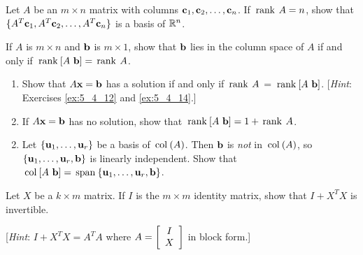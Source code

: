 {{\begin{multicols}{2}
\begin{ex}
Let $A$ be an $m \times n$ matrix with columns $\textbf{c}_{1}, \textbf{c}_{2}, \dots, \textbf{c}_{n}$. If $\thinspace\operatorname{rank\medspace} A = n$, show that $\{A^{T}\textbf{c}_{1}, A^{T}\textbf{c}_{2}, \dots, A^{T}\textbf{c}_{n}\}$ is a basis of $\mathbb{R}^n$.
\end{ex}

\begin{ex}
	\label{ex:5_4_14}
If $A$ is $m \times n$ and $\textbf{b}$ is $m \times 1$, show that $\textbf{b}$ lies in the column space of $A$ if and only if \newline $\thinspace\operatorname{rank\medspace} [A \ \textbf{b}] = \thinspace\operatorname{rank\medspace} A$.
\end{ex}

\begin{ex}
\begin{enumerate}[label={\alph*.}]
\item Show that $A\textbf{x} = \textbf{b}$ has a solution if and only if $\thinspace\operatorname{rank\medspace} A$ = $\func{rank}[A \ \vect{b}]$. [\textit{Hint}: Exercises \ref{ex:5_4_12} and \ref{ex:5_4_14}.] 

\item If $A\textbf{x} = \textbf{b}$ has no solution, show that \newline $\thinspace\operatorname{rank\medspace}[A \ \textbf{b}] = 1 + \thinspace\operatorname{rank\medspace} A$.

\end{enumerate}
\begin{sol}
\begin{enumerate}[label={\alph*.}]
\setcounter{enumi}{1}
\item  Let $\{\textbf{u}_{1}, \dots, \textbf{u}_{r}\}$ be a basis of $\thinspace\operatorname{col\medspace}(A)$. Then $\textbf{b}$ is \textit{not} in $\thinspace\operatorname{col\medspace}(A)$, so $\{\textbf{u}_{1}, \dots, \textbf{u}_{r}, \textbf{b}\}$ is linearly independent. Show that $\thinspace\operatorname{col\medspace}[A \ \textbf{b}] = \thinspace\operatorname{span\medspace}\{\textbf{u}_{1}, \dots, \textbf{u}_{r}, \textbf{b}\}$.

\end{enumerate}
\end{sol}
\end{ex}

\begin{ex}
Let $X$ be a $k \times m$ matrix. If $I$ is the $m \times m$ identity matrix, show that $I + X^{T}X$ is invertible.


[\textit{Hint}: $I + X^{T}X = A^{T}A$ where 
$A = \left[ \begin{array}{c}
I\\
X
\end{array} \right]$ in block form.]
\end{ex}


\end{multicols}}}
